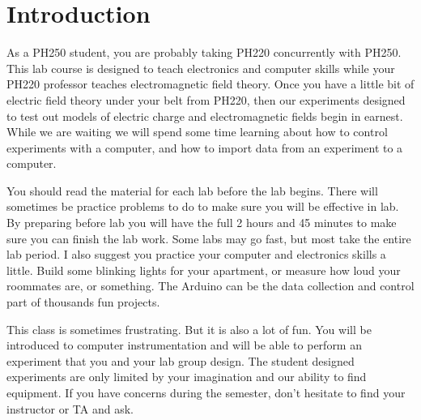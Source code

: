 \chapter{Introduction}
As a PH250 student, you are probably taking PH220 concurrently with PH250. This lab course is designed to teach electronics and computer skills while your PH220 professor teaches electromagnetic field theory. Once you have a little bit of electric field theory under your belt from PH220, then our experiments designed to test out models of electric charge and electromagnetic fields begin in earnest. While we are waiting we will spend some time learning about how to control experiments with a computer, and how to import data from an experiment to a computer.

You should read the material for each lab before the lab begins. There will sometimes be practice problems to do to make sure you will be effective in lab. By preparing before lab you will have the full 2 hours and 45 minutes to make sure you can finish the lab work. Some labs may go fast, but most take the entire lab period. I also suggest you practice your computer and electronics skills a little. Build some blinking lights for your apartment, or measure how loud your roommates are, or something. The Arduino can be the data collection and control part of thousands fun projects.

This class is sometimes frustrating. But it is also a lot of fun. You will be introduced to computer instrumentation and will be able to perform an experiment that you and your lab group design. The student designed experiments are only limited by your imagination and our ability to find equipment. If you have concerns during the semester, don't hesitate to find your instructor or TA and ask. 